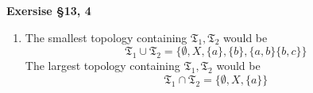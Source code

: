 \documentclass[12pt]{article}
\newenvironment{ques}[1]{\textbf{Exersise #1}\vspace{1 mm}\\ }{\bigskip}
\theoremstyle{definition}
\newcommand{\T}{\mathfrak{T}}
\begin{document}
\begin{ques}{\S 13, 4}
\begin{enumerate}
			
		\item
			The smallest topology containing $\T_1, \T_2$ would be
			$$\T_1 \cup \T_2 = \{\emptyset, X, \{a\}, \{b\}, \{a, b\} \{b, c\}\}$$
			The largest topology containing $\T_1, \T_2$ would be
			$$\T_1 \cap \T_2 = \{\emptyset, X, \{a\}\}$$
	\end{enumerate}
\end{ques}
\end{document}
